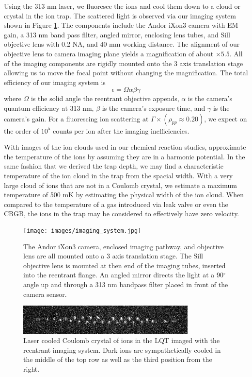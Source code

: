 Using the 313 nm laser, we fluoresce the  ions and cool them down to a cloud or crystal in the ion trap. The scattered light is observed via our imaging system shown in Figure \ref{fig: imaging system}. The components include the Andor iXon3 camera with EM gain, a 313 nm band pass filter, angled mirror, enclosing lens tubes, and Sill objective lens with 0.2 NA, and 40 mm working distance. The alignment of our objective lens to camera imaging plane yields a magnification of about $\times5.5$. All of the imaging components are rigidly mounted onto the 3 axis translation stage allowing us to move the focal point without changing the magnification. The total efficiency of our imaging system is
\begin{equation}
	\epsilon = \Omega \alpha \beta \gamma
	\label{eq: fluorescence efficiency}
\end{equation}
where $\Omega$ is the solid angle the reentrant objective appends, $\alpha$ is the camera's quantum efficiency at 313 nm, $\beta$ is the camera's exposure time, and $\gamma$ is the camera's gain. For a fluorescing ion scattering at $\Gamma \times (\rho_{pp} \approx 0.20)$, we expect on the order of $10^5$ counts per ion after the imaging inefficiencies.

With images of the ion clouds used in our chemical reaction studies, approximate the temperature of the ions by assuming they are in a harmonic potential. In the same fashion that we derived the trap depth, we may find a characteristic temperature of the ion cloud in the trap from the spacial width. With a very large cloud of ions that are not in a Coulomb crystal, we estimate a maximum temperature of 500 mK by estimating the physical width of the ion cloud. When compared to the temperature of a gas introduced via leak valve or even the CBGB, the ions in the trap may be considered to effectively have zero velocity.

\begin{figure}[H]
	\centering
	\texttt{[image: images/imaging\_system.jpg]}
	\caption{The Andor iXon3 camera, enclosed imaging pathway, and objective lens are all mounted onto a 3 axis translation stage. The Sill objective lens is mounted at then end of the imaging tubes, inserted into the reentrant flange. An angled mirror directs the light at a 90$^\circ$ angle up and through a 313 nm bandpass filter placed in front of the camera sensor.}
	\label{fig: imaging system}
\end{figure}

\begin{figure}[H]
	\centering
	\includegraphics[width=0.8\textwidth]{images/ion_crystal.png}
	\caption{Laser cooled Coulomb crystal of  ions in the LQT imaged with the reentrant imaging system. Dark  ions are sympathetically cooled in the middle of the top row as well as the third position from the right.}
	\label{fig: ion crystal}
\end{figure}